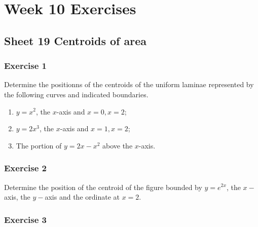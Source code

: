 \documentclass[
  english,
  11pt,
  oneside]{book}
\providecommand{\tightlist}{%
  \setlength{\itemsep}{0pt}\setlength{\parskip}{0pt}}
\newcommand{\slide}{}
\theoremstyle{definition}
\theoremstyle{definition}
\theoremstyle{definition}
\theoremstyle{definition}
\theoremstyle{remark}
\begin{document}
\slide

\begin{slidesonly}

\hbox{}
\slide

\end{slidesonly}

\chapter*{Week 10 Exercises}\label{week-10-exercises}

\section{Sheet 19 Centroids of area}\label{sheet-19-centroids-of-area}

\slide

\subsection*{Exercise 1}\label{exercise-1-11}

Determine the positionns of the centroids of the uniform laminae represented by the following curves and indicated boundaries.

\begin{enumerate}
\def\labelenumi{\roman{enumi}.}
\tightlist
\item
  \(y=x^2\), the \(x\)-axis and \(x=0, x=2\);
\item
  \(y=2x^3\), the \(x\)-axis and \(x=1, x=2\);
\item
  The portion of \(y=2x-x^2\) above the \(x\)-axis.
\end{enumerate}

\slide

\subsection*{Exercise 2}\label{exercise-2-11}

Determine the position of the centroid of the figure bounded by \(y = e^{2x}\), the \(x-\)axis, the \(y-\)axis and the ordinate at \(x = 2\).

\slide

\subsection*{Exercise 3}\label{exercise-3-9}
\end{document}
